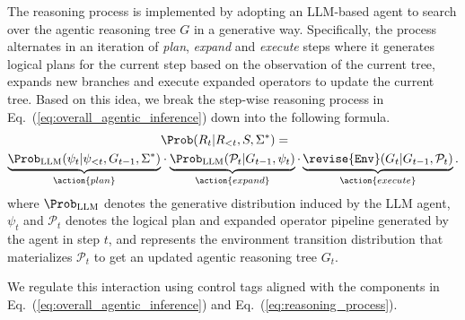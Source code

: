 The reasoning process is implemented by adopting an LLM-based agent to search over the agentic reasoning tree $G$ in a generative way. Specifically, the process alternates in an iteration of \textit{plan}, \textit{expand} and \textit{execute} steps where it generates logical plans for the current step based on the observation of the current tree, expands new branches and execute expanded operators to update the current tree. Based on this idea, we break the step-wise reasoning process in Eq.~(\ref{eq:overall_agentic_inference}) down into the following formula.
\begin{equation}
\label{eq:reasoning_process}
\begin{split}
&  \Prob(R_t | R_{<t}, S, \Sigma^\ast) =  \\
\underbrace{\Prob_{\text{LLM}}(\psi_t | \psi_{<t}, G_{t-1}, \Sigma^\ast)}_{\action{plan}} 
& \cdot
\underbrace{\Prob_{\text{LLM}}(\mathcal{P}_t | G_{t-1}, \psi_{t})}_{\action{expand}}
\cdot
\underbrace{\revise{\mathtt{Env}}(G_t | G_{t-1}, \mathcal{P}_t)}_{\action{execute}}.
\end{split}
\end{equation}
where $\Prob_{\text{LLM}}$ denotes the generative distribution induced by the LLM agent, $\psi_t$ and $\mathcal{P}_t$ denotes the logical plan and expanded operator pipeline generated by the agent in step $t$, and  represents the environment transition distribution that materializes $\mathcal{P}_t$ to get an updated agentic reasoning tree $G_t$.


 We regulate this interaction using control tags aligned with the components in Eq.~(\ref{eq:overall_agentic_inference}) and Eq.~(\ref{eq:reasoning_process}).



